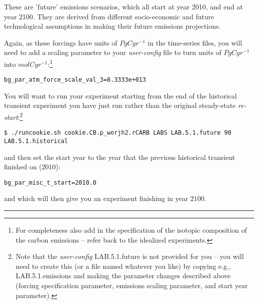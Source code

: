 These are 'future' emissions scenarios, which all start at year 2010, and end at year 2100. They are derived from different socio-economic and future technological assumptions in making their future emissions projections.

\vspace{1mm}

Again, as these forcings have units of \(PgCyr^{-1}\) in the time-series files, you will need to add a scaling parameter to your \textit{user-config} file to turn units of \(PgCyr^{-1}\) into \(mol C yr^{-1}\):\footnote{For completeness also add in the specification of the isotopic composition of the carbon emissions -- refer back to the idealized experiments.}
\vspace{-2pt}\small\begin{verbatim}
bg_par_atm_force_scale_val_3=8.3333e+013
\end{verbatim}\normalsize\vspace{-2pt}

You will want to run your experiment starting from the end of the historical transient experiment you have just run rather than the original steady-state \textit{re-start}:\footnote{Note that the \textit{user-config} \textsf{\footnotesize LAB.5.1.future } is not provided for you – you will need to create this (or a file named whatever you like) by copying e.g., \textsf{\footnotesize LAB.5.1.emissions} and making the parameter changes described above (forcing specification parameter, emissions scaling parameter, and start year parameter).}
\vspace{-2pt}\small\begin{verbatim}
$ ./runcookie.sh cookie.CB.p_worjh2.rCARB LABS LAB.5.1.future 90 LAB.5.1.historical
\end{verbatim}\normalsize\vspace{-2pt}
and then set the start year to the year that the previous historical transient finished on (\(2010\)):
\vspace{-2pt}\small\begin{verbatim}
bg_par_misc_t_start=2010.0
\end{verbatim}\normalsize\vspace{-2pt}
and which will then give you an experiment finishing in year \(2100\).

\vspace{1mm} \noindent\rule{4cm}{0.1mm} \vspace{2mm}

